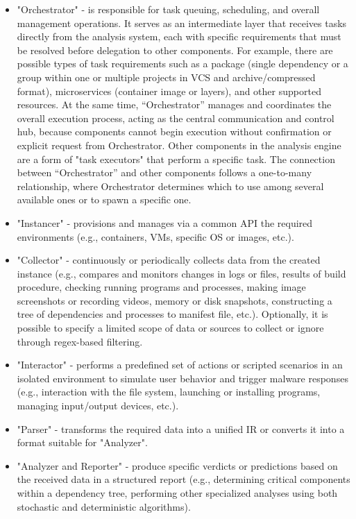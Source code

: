 \begin{itemize}
    \item "Orchestrator" - is responsible for task queuing, scheduling, and overall management operations. It serves as an intermediate layer that receives tasks directly from the analysis system, each with specific requirements that must be resolved before delegation to other components. For example, there are possible types of task requirements such as a package (single dependency or a group within one or multiple projects in VCS and archive/compressed format), microservices (container image or layers), and other supported resources. At the same time, “Orchestrator” manages and coordinates the overall execution process, acting as the central communication and control hub, because components cannot begin execution without confirmation or explicit request from Orchestrator. Other components in the analysis engine are a form of "task executors" that perform a specific task. The connection between “Orchestrator” and other components follows a one-to-many relationship, where Orchestrator determines which to use among several available ones or to spawn a specific one.
    \item "Instancer" - provisions and manages via a common API the required environments (e.g., containers, VMs, specific OS or images, etc.).
    \item "Collector" - continuously or periodically collects data from the created instance (e.g., compares and monitors changes in logs or files, results of build procedure, checking running programs and processes, making image screenshots or recording videos, memory or disk snapshots, constructing a tree of dependencies and processes to manifest file, etc.). Optionally, it is possible to specify a limited scope of data or sources to collect or ignore through regex-based filtering.
    \item "Interactor" - performs a predefined set of actions or scripted scenarios in an isolated environment to simulate user behavior and trigger malware responses (e.g., interaction with the file system, launching or installing programs, managing input/output devices, etc.).
    \item "Parser" - transforms the required data into a unified IR or converts it into a format suitable for "Analyzer".
    \item "Analyzer and Reporter" - produce specific verdicts or predictions based on the received data in a structured report (e.g., determining critical components within a dependency tree, performing other specialized analyses using both stochastic and deterministic algorithms).
\end{itemize}

